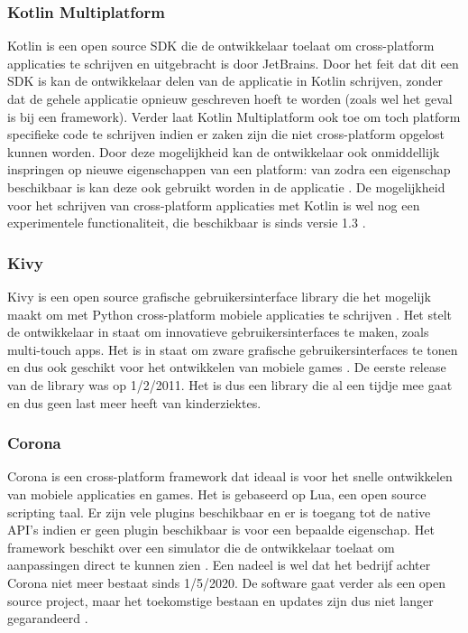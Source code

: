 \subsubsection{Kotlin Multiplatform}
\label{subsubsec:Kotlin}

Kotlin is een open source SDK die de ontwikkelaar toelaat om cross-platform applicaties te schrijven en uitgebracht is door JetBrains. Door het feit dat dit een SDK is kan de ontwikkelaar delen van de applicatie in Kotlin schrijven, zonder dat de gehele applicatie opnieuw geschreven hoeft te worden (zoals wel het geval is bij een framework). Verder laat Kotlin Multiplatform ook toe om toch platform specifieke code te schrijven indien er zaken zijn die niet cross-platform opgelost kunnen worden. Door deze mogelijkheid kan de ontwikkelaar ook onmiddellijk inspringen op nieuwe eigenschappen van een platform: van zodra een eigenschap beschikbaar is kan deze ook gebruikt worden in de applicatie \autocite{JetBrains2020}. De mogelijkheid voor het schrijven van cross-platform applicaties met Kotlin is wel nog een experimentele functionaliteit, die beschikbaar is sinds versie 1.3 \autocite{Belov2018}.


\subsubsection{Kivy}
\label{subsubsec:Kivy}

Kivy is een open source grafische gebruikersinterface library die het mogelijk maakt om met Python cross-platform mobiele applicaties te schrijven \autocite{Vasilkov2015}. Het stelt de ontwikkelaar in staat om innovatieve gebruikersinterfaces te maken, zoals multi-touch apps. Het is in staat om zware grafische gebruikersinterfaces te tonen en dus ook geschikt voor het ontwikkelen van mobiele games \autocite{Kivy2020}. De eerste release van de library was op 1/2/2011. Het is dus een library die al een tijdje mee gaat en dus geen last meer heeft van kinderziektes.

\subsubsection{Corona}
\label{subsubsec:Corona}

Corona is een cross-platform framework dat ideaal is voor het snelle ontwikkelen van mobiele applicaties en games. Het is gebaseerd op Lua, een open source scripting taal. Er zijn vele plugins beschikbaar en er is toegang tot de native API's indien er geen plugin beschikbaar is voor een bepaalde eigenschap. Het framework beschikt over een simulator die de ontwikkelaar toelaat om aanpassingen direct te kunnen zien \autocite{Coronalabs2020}. Een nadeel is wel dat het bedrijf achter Corona niet meer bestaat sinds 1/5/2020. De software gaat verder als een open source project, maar het toekomstige bestaan en updates zijn dus niet langer gegarandeerd \autocite{Shcherban2020}.

